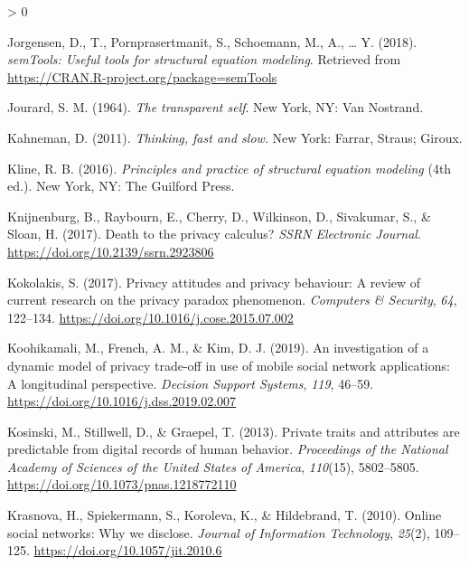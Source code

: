 \documentclass[
  english,
  man,floatsintext]{apa6}
\newlength{\cslhangindent}
\newenvironment{CSLReferences}[2] %
 {%
  \setlength{\parindent}{0pt}
  \ifodd #1 \everypar{\setlength{\hangindent}{\cslhangindent}}\ignorespaces\fi
  \ifnum #2 > 0
  \setlength{\parskip}{#2\baselineskip}
  \fi
 }%
 {}
\begin{document}
\begin{CSLReferences}{1}{0}
\leavevmode\hypertarget{ref-R-semTools}{}%
Jorgensen, D., T., Pornprasertmanit, S., Schoemann, M., A., \ldots{} Y. (2018). \emph{{semTools}: Useful tools for structural equation modeling}. Retrieved from \url{https://CRAN.R-project.org/package=semTools}

\leavevmode\hypertarget{ref-jourardTransparentSelf1964}{}%
Jourard, S. M. (1964). \emph{The transparent self}. New York, NY: Van Nostrand.

\leavevmode\hypertarget{ref-kahnemanThinkingFastSlow2011}{}%
Kahneman, D. (2011). \emph{Thinking, fast and slow}. New York: Farrar, Straus; Giroux.

\leavevmode\hypertarget{ref-klinePrinciplesPracticeStructural2016}{}%
Kline, R. B. (2016). \emph{Principles and practice of structural equation modeling} (4th ed.). New York, NY: The Guilford Press.

\leavevmode\hypertarget{ref-knijnenburgDeathPrivacyCalculus2017}{}%
Knijnenburg, B., Raybourn, E., Cherry, D., Wilkinson, D., Sivakumar, S., \& Sloan, H. (2017). Death to the privacy calculus? \emph{SSRN Electronic Journal}. \url{https://doi.org/10.2139/ssrn.2923806}

\leavevmode\hypertarget{ref-kokolakisPrivacyAttitudesPrivacy2017}{}%
Kokolakis, S. (2017). Privacy attitudes and privacy behaviour: {A} review of current research on the privacy paradox phenomenon. \emph{Computers \& Security}, \emph{64}, 122--134. \url{https://doi.org/10.1016/j.cose.2015.07.002}

\leavevmode\hypertarget{ref-koohikamaliInvestigationDynamicModel2019}{}%
Koohikamali, M., French, A. M., \& Kim, D. J. (2019). An investigation of a dynamic model of privacy trade-off in use of mobile social network applications: {A} longitudinal perspective. \emph{Decision Support Systems}, \emph{119}, 46--59. \url{https://doi.org/10.1016/j.dss.2019.02.007}

\leavevmode\hypertarget{ref-kosinskiPrivateTraitsAttributes2013}{}%
Kosinski, M., Stillwell, D., \& Graepel, T. (2013). Private traits and attributes are predictable from digital records of human behavior. \emph{Proceedings of the National Academy of Sciences of the United States of America}, \emph{110}(15), 5802--5805. \url{https://doi.org/10.1073/pnas.1218772110}

\leavevmode\hypertarget{ref-krasnovaOnlineSocialNetworks2010}{}%
Krasnova, H., Spiekermann, S., Koroleva, K., \& Hildebrand, T. (2010). Online social networks: {Why} we disclose. \emph{Journal of Information Technology}, \emph{25}(2), 109--125. \url{https://doi.org/10.1057/jit.2010.6}


\end{CSLReferences}
\end{document}
